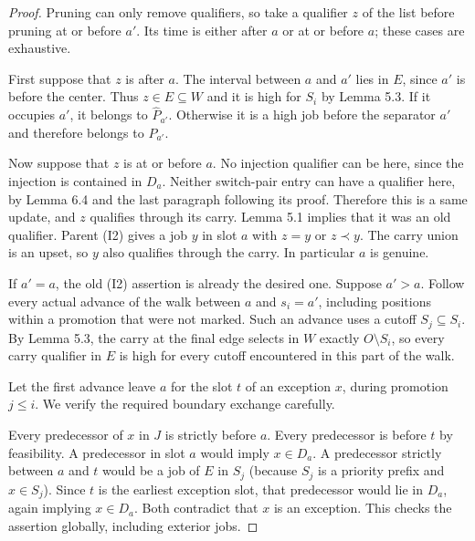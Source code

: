 \begin{proof}
Pruning can only remove qualifiers, so take a qualifier \(z\) of the list before pruning at or before \(a'\). Its time is either after \(a\) or at or before \(a\); these cases are exhaustive.

First suppose that \(z\) is after \(a\). The interval between \(a\) and \(a'\) lies in \(E\), since \(a'\) is before the center. Thus \(z\in E\subseteq W\) and it is high for \(S_i\) by Lemma 5.3. If it occupies \(a'\), it belongs to \(\widehat P_{a'}\). Otherwise it is a high job before the separator \(a'\) and therefore belongs to \(P_{a'}\).

Now suppose that \(z\) is at or before \(a\). No injection qualifier can be here, since the injection is contained in \(D_a\). Neither switch-pair entry can have a qualifier here, by Lemma 6.4 and the last paragraph following its proof. Therefore this is a same update, and \(z\) qualifies through its carry. Lemma 5.1 implies that it was an old qualifier. Parent (I2) gives a job \(y\) in slot \(a\) with \(z=y\) or \(z\prec y\). The carry union is an upset, so \(y\) also qualifies through the carry. In particular \(a\) is genuine.

If \(a'=a\), the old (I2) assertion is already the desired one. Suppose \(a'>a\). Follow every actual advance of the walk between \(a\) and \(s_i=a'\), including positions within a promotion that were not marked. Such an advance uses a cutoff \(S_j\subseteq S_i\). By Lemma 5.3, the carry at the final edge selects in \(W\) exactly \(O\setminus S_i\), so every carry qualifier in \(E\) is high for every cutoff encountered in this part of the walk.

Let the first advance leave \(a\) for the slot \(t\) of an exception \(x\), during promotion \(j\leq i\). We verify the required boundary exchange carefully.

Every predecessor of \(x\) in \(J\) is strictly before \(a\). Every predecessor is before \(t\) by feasibility. A predecessor in slot \(a\) would imply \(x\in D_a\). A predecessor strictly between \(a\) and \(t\) would be a job of \(E\) in \(S_j\) (because \(S_j\) is a priority prefix and \(x\in S_j\)). Since \(t\) is the earliest exception slot, that predecessor would lie in \(D_a\), again implying \(x\in D_a\). Both contradict that \(x\) is an exception. This checks the assertion globally, including exterior jobs.


\end{proof}
